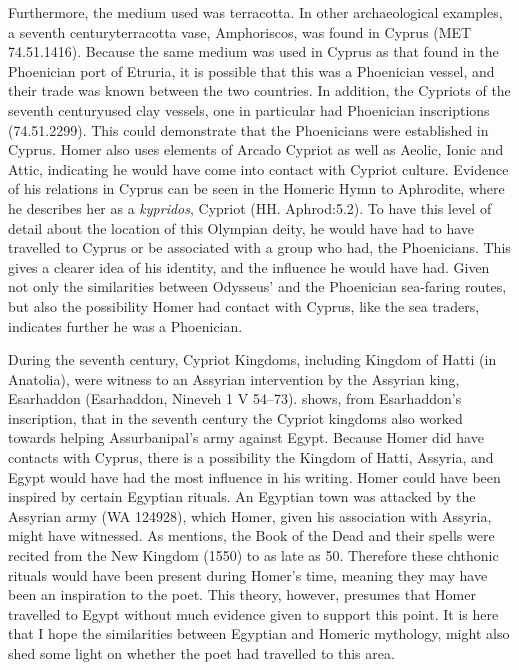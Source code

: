 	Furthermore, the medium used was terracotta. In other archaeological examples, a seventh century\BC terracotta vase, Amphoriscos, was found in Cyprus (MET 74.51.1416). Because the same medium was used in Cyprus as that found in the Phoenician port of Etruria, it is possible that this was a Phoenician vessel, and their trade was known between the two countries. In addition, the Cypriots of the seventh century\BC used clay vessels, one in particular had Phoenician inscriptions (74.51.2299). This could demonstrate that the Phoenicians were established in Cyprus.  Homer also uses elements of Arcado Cypriot \parencite{Willmott2007} as well as Aeolic, Ionic and Attic, indicating he would have come into contact with Cypriot culture. Evidence of his relations in Cyprus can be seen in the Homeric Hymn to Aphrodite, where he describes her as a \emph{kypridos}, Cypriot (HH. Aphrod:5.2). To have this level of detail about the location of this Olympian deity, he would have had to have travelled to Cyprus or be associated with a group who had, the Phoenicians.  This gives a clearer idea of his identity, and the influence he would have had. Given not only the similarities between Odysseus’ and the Phoenician sea-faring routes, but also the possibility Homer had contact with Cyprus, like the sea traders, indicates further he was a Phoenician.
	
	During the seventh century\BC, Cypriot Kingdoms, including Kingdom of Hatti (in Anatolia), were witness to an Assyrian intervention by the Assyrian king, Esarhaddon (Esarhaddon, Nineveh 1 V 54–73). \textcite{Radner2012} shows, from Esarhaddon’s inscription, that in the seventh century the Cypriot kingdoms also worked towards helping Assurbanipal’s army against Egypt.  Because Homer did have contacts with Cyprus, there is a possibility the Kingdom of Hatti, Assyria, and Egypt would have had the most influence in his writing. Homer could have been inspired by certain Egyptian rituals. An Egyptian town was attacked by the Assyrian army (WA 124928), which Homer, given his association with Assyria, might have witnessed. As \textcite[54]{Taylor2010} mentions, the Book of the Dead and their spells were recited from the New Kingdom (1550\BC) to as late as 50\BC. Therefore these chthonic rituals would have been present during Homer’s time, meaning they may have been an inspiration to the poet. This theory, however, presumes that Homer travelled to Egypt without much evidence given to support this point. It is here that I hope the similarities between Egyptian and Homeric mythology, might also shed some light on whether the poet had travelled to this area.
	
